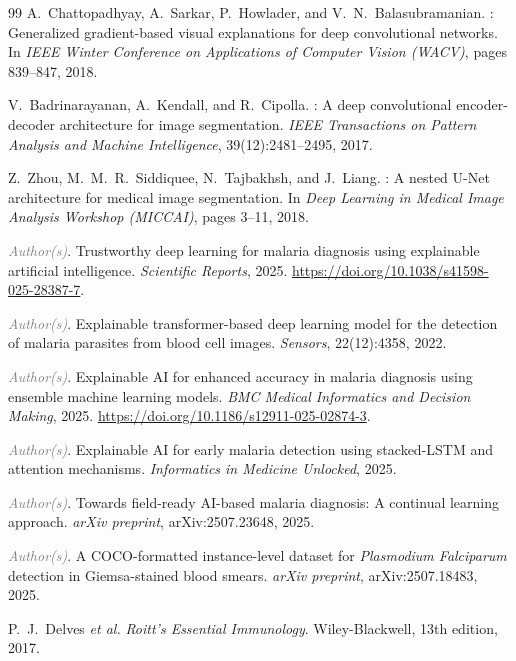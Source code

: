 \documentclass[10pt,twocolumn]{article}
\newcommand{\etal}{\textit{et al.}}
\newcommand{\placeholder}[1]{\textcolor{gray}{\textit{#1}}}
\begin{document}
\begin{thebibliography}{99}
A.~Chattopadhyay, A.~Sarkar, P.~Howlader, and V.~N.~Balasubramanian.
: Generalized gradient-based visual explanations for
  deep convolutional networks.
\newblock In \textit{IEEE Winter Conference on Applications of Computer Vision
  (WACV)}, pages 839--847, 2018.

V.~Badrinarayanan, A.~Kendall, and R.~Cipolla.
: A deep convolutional encoder-decoder architecture for
  image segmentation.
\newblock \textit{IEEE Transactions on Pattern Analysis and Machine
  Intelligence}, 39(12):2481--2495, 2017.

Z.~Zhou, M.~M.~R.~Siddiquee, N.~Tajbakhsh, and J.~Liang.
: A nested {U-Net} architecture for medical image
  segmentation.
\newblock In \textit{Deep Learning in Medical Image Analysis Workshop
  (MICCAI)}, pages 3--11, 2018.

\placeholder{Author(s)}.
\newblock Trustworthy deep learning for malaria diagnosis using explainable
  artificial intelligence.
\newblock \textit{Scientific Reports}, 2025.
\newblock \url{https://doi.org/10.1038/s41598-025-28387-7}.

\placeholder{Author(s)}.
\newblock Explainable transformer-based deep learning model for the detection
  of malaria parasites from blood cell images.
\newblock \textit{Sensors}, 22(12):4358, 2022.

\placeholder{Author(s)}.
\newblock Explainable {AI} for enhanced accuracy in malaria diagnosis using
  ensemble machine learning models.
\newblock \textit{BMC Medical Informatics and Decision Making}, 2025.
\newblock \url{https://doi.org/10.1186/s12911-025-02874-3}.

\placeholder{Author(s)}.
\newblock Explainable {AI} for early malaria detection using stacked-{LSTM}
  and attention mechanisms.
\newblock \textit{Informatics in Medicine Unlocked}, 2025.

\placeholder{Author(s)}.
\newblock Towards field-ready {AI}-based malaria diagnosis: A continual
  learning approach.
\newblock \textit{arXiv preprint}, arXiv:2507.23648, 2025.

\placeholder{Author(s)}.
\newblock A {COCO}-formatted instance-level dataset for
  \textit{Plasmodium Falciparum} detection in {Giemsa}-stained blood smears.
\newblock \textit{arXiv preprint}, arXiv:2507.18483, 2025.

P.~J.~Delves \etal
\newblock \textit{Roitt's Essential Immunology}.
\newblock Wiley-Blackwell, 13th edition, 2017.

\end{thebibliography}
\end{document}
